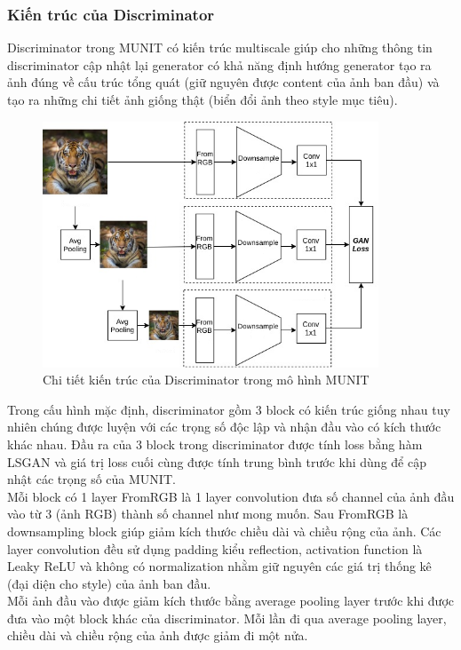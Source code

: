 {    \subsubsection{Kiến trúc của Discriminator}
    \noindent Discriminator trong MUNIT có kiến trúc multiscale giúp cho những thông tin discriminator cập nhật lại generator có khả năng định hướng generator tạo ra ảnh đúng về cấu trúc tổng quát (giữ nguyên được content của ảnh ban đầu) và tạo ra những chi tiết ảnh giống thật (biển đổi ảnh theo style mục tiêu).
    \begin{figure}[H]
    \centering
    \includegraphics[width=10cm] {images/detail_dis.png}
    \caption{Chi tiết kiến trúc của Discriminator trong mô hình MUNIT}
    \label{fig:detail_dis}
    \end{figure}
    \noindent Trong cấu hình mặc định, discriminator gồm 3 block có kiến trúc giống nhau tuy nhiên chúng được luyện với các trọng số độc lập và nhận đầu vào có kích thước khác nhau. Đầu ra của 3 block trong discriminator được tính loss bằng hàm LSGAN và giá trị loss cuối cùng được tính trung bình trước khi dùng để cập nhật các trọng số của MUNIT.\\
    Mỗi block có 1 layer FromRGB là 1 layer convolution đưa số channel của ảnh đầu vào từ 3 (ảnh RGB) thành số channel như mong muốn. Sau FromRGB là downsampling block giúp giảm kích thước chiều dài và chiều rộng của ảnh. Các layer convolution đều sử dụng padding kiểu reflection, activation function là Leaky ReLU và không có normalization nhằm giữ nguyên các giá trị thống kê (đại diện cho style) của ảnh ban đầu.\\
    Mỗi ảnh đầu vào được giảm kích thước bằng average pooling layer trước khi được đưa vào một block khác của discriminator. Mỗi lần đi qua average pooling layer, chiều dài và chiều rộng của ảnh được giảm đi một nửa.\\
}

